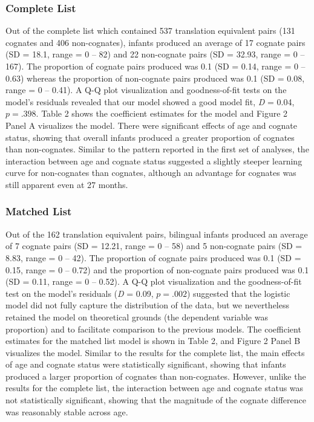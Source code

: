 \documentclass[
  english,
  ,man,floatsintext]{apa6}
\begin{document}
\hypertarget{complete-list-1}{%
\subsubsection{Complete List}\label{complete-list-1}}

Out of the complete list which contained 537 translation equivalent pairs (131 cognates and 406 non-cognates), infants produced an average of 17 cognate pairs (SD = 18.1, range = 0 -- 82) and 22 non-cognate pairs (SD = 32.93, range = 0 -- 167). The proportion of cognate pairs produced was 0.1 (SD = 0.14, range = 0 -- 0.63) whereas the proportion of non-cognate pairs produced was 0.1 (SD = 0.08, range = 0 -- 0.41). A Q-Q plot visualization and goodness-of-fit tests on the model's residuals revealed that our model showed a good model fit, \emph{D} = 0.04, \(p = .398\). Table 2 shows the coefficient estimates for the model and Figure 2 Panel A visualizes the model. There were significant effects of age and cognate status, showing that overall infants produced a greater proportion of cognates than non-cognates. Similar to the pattern reported in the first set of analyses, the interaction between age and cognate status suggested a slightly steeper learning curve for non-cognates than cognates, although an advantage for cognates was still apparent even at 27 months.

\hypertarget{matched-list-1}{%
\subsubsection{Matched List}\label{matched-list-1}}

Out of the 162 translation equivalent pairs, bilingual infants produced an average of 7 cognate pairs (SD = 12.21, range = 0 -- 58) and 5 non-cognate pairs (SD = 8.83, range = 0 -- 42). The proportion of cognate pairs produced was 0.1 (SD = 0.15, range = 0 -- 0.72) and the proportion of non-cognate pairs produced was 0.1 (SD = 0.11, range = 0 -- 0.52). A Q-Q plot visualization and the goodness-of-fit test on the model's residuals (\emph{D} = 0.09, \(p = .002\)) suggested that the logistic model did not fully capture the distribution of the data, but we nevertheless retained the model on theoretical grounds (the dependent variable was proportion) and to facilitate comparison to the previous models. The coefficient estimates for the matched list model is shown in Table 2, and Figure 2 Panel B visualizes the model. Similar to the results for the complete list, the main effects of age and cognate status were statistically significant, showing that infants produced a larger proportion of cognates than non-cognates. However, unlike the results for the complete list, the interaction between age and cognate status was not statistically significant, showing that the magnitude of the cognate difference was reasonably stable across age.
\end{document}
